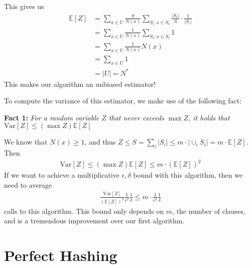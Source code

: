 \documentclass[11pt]{article}
\begin{document}
This gives us
%
\begin{align*}
	\mathbb{E}[Z]
		&= \sum_{x \in U} \frac{S}{N(x)} \sum_{S_i: x \in S_i} \frac{|S_i|}{S} \cdot \frac{1}{|S_i|} \\
		&= \sum_{x \in U} \frac{1}{N(x)} \sum_{S_i: x \in S_i} 1 \\
		&= \sum_{x \in U} \frac{1}{N(x)} N(x) \\
		&= \sum_{x \in U} 1 \\
		&= |U| = N^*
\end{align*}
%
This makes our algorithm an unbiased estimator!

To compute the variance of this estimator, we make use of the following fact:

\marginpar{\Large \WritingHand} \begin{mdframed}[backgroundcolor=teal!10,topline=false,bottomline=false,leftline=false,rightline=false] 
		{\bf Fact 1:}{ \em For a random variable $Z$ that never exceeds $\max Z$, it holds that $\text{Var}[Z] \leq (\max Z) \mathbb{E}[Z]$}
\end{mdframed}

We know that $N(x)\geq 1$, and thus $Z \leq S = \sum_i |S_i| \leq m \cdot | \cup_i S_i | = m \cdot \mathbb{E}[Z]$. Then
%
\begin{align*}
	\text{Var}[Z] \leq (\max Z) \mathbb{E}[Z] \leq m \cdot (\mathbb{E}[Z])^2
\end{align*}
%
If we want to achieve a multiplicative $\epsilon,\delta$ bound with this algorithm, then we need to average
%
\begin{align*}
	\frac{\text{Var}[Z]}{(\mathbb{E}[Z])^2} \frac{1}{\epsilon^2}\frac{1}{\delta} \leq m \cdot \frac{1}{\epsilon^2}\frac{1}{\delta}
\end{align*}
%
calls to this algorithm. This bound only depends on $m$, the number of clauses, and is a tremendous improvement over our first algorithm.


\section{Perfect Hashing}
\end{document}

